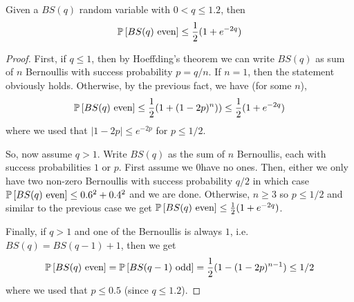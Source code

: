 \begin{corollary}\label{cor:bernoullisumeven}
Given a $BS(q)$ random variable with $0 < q \le 1.2$,  then
$$ \P{BS(q) \text{ even}} \leq \frac12(1+e^{-2q})$$
\end{corollary}
\begin{proof}
First, if $q\leq 1$, then by Hoeffding's theorem we can write $BS(q)$ as sum of $n$ Bernoullis with success probability $p=q/n$. If $n=1$, then the statement obviously holds. Otherwise, by the previous fact, we have (for some $n$),
 $$\P{BS(q) \text{ even} } \leq \frac12 (1+(1-2p)^n)) \leq \frac12(1+e^{-2q})$$
 where we used that $|1-2p|\leq e^{-2p}$ for $p\leq 1/2$.
 
So, now assume $q>1$.
Write $BS(q)$ as the sum of $n$ Bernoullis, each with success probabilities $1$ or $p$. First assume we 0have no ones. 
Then, either we only have two non-zero Bernoullis with success probability $q/2$ in which case $\P{BS(q)\text{ even}}\leq 0.6^2 + 0.4^2$ and we are done.
Otherwise, $n\geq 3$ so $p\leq 1/2$ and similar to the previous case we get $\P{BS(q) \text{ even}} \leq \frac12(1+e^{-2q})$.

Finally, if $q>1$ and one of the Bernoullis is always $1$, i.e. $BS(q) = BS(q-1)+1$, then we get
$$\P{BS(q)\text{ even}} = \P{BS(q-1) \text{ odd}} = \frac12(1-(1-2p)^{n-1}) \le 1/2$$
where we used that $p \le 0.5$ (since $q \le 1.2$).
\end{proof}




